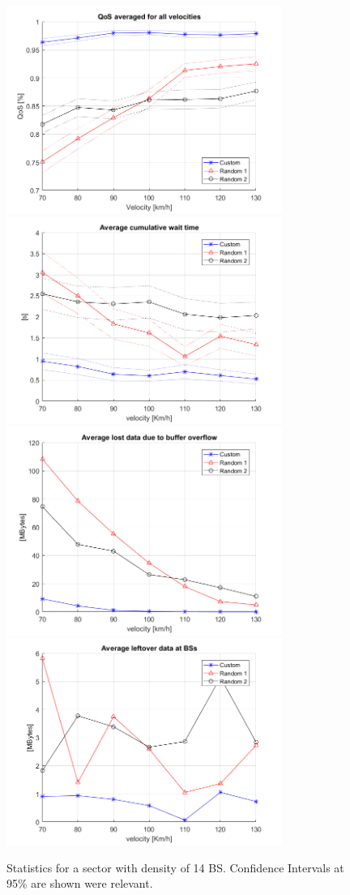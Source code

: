 \documentclass[conference,10pt]{IEEEtran}
\begin{document}
\begin{figure}[t]
	\centering
	\includegraphics[width=9cm]{QoS.png} \includegraphics[width=9cm]{UE_wait_time.png}
	\includegraphics[width=9cm]{UE_buffer_overflow.png} \includegraphics[width=9cm]{BS_leftover_data.png}
	\caption{Statistics for a sector with density of 14 BS. Confidence Intervals at 95\% are shown were relevant.}
	\label{fig:7BS_all_stats}
\end{figure}
\end{document}
